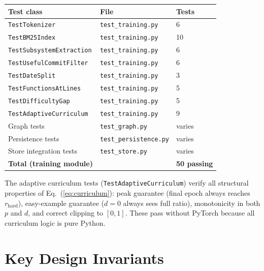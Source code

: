 \documentclass[11pt,a4paper]{article}
\begin{document}
\begin{center}
\begin{tabular}{@{}lll@{}}
\toprule
\textbf{Test class} & \textbf{File} & \textbf{Tests} \\
\midrule
\texttt{TestTokenizer}           & \texttt{test\_training.py} & 6  \\
\texttt{TestBM25Index}           & \texttt{test\_training.py} & 10 \\
\texttt{TestSubsystemExtraction} & \texttt{test\_training.py} & 6  \\
\texttt{TestUsefulCommitFilter}  & \texttt{test\_training.py} & 6  \\
\texttt{TestDateSplit}           & \texttt{test\_training.py} & 3  \\
\texttt{TestFunctionsAtLines}    & \texttt{test\_training.py} & 5  \\
\texttt{TestDifficultyGap}       & \texttt{test\_training.py} & 5  \\
\texttt{TestAdaptiveCurriculum}  & \texttt{test\_training.py} & 9  \\
\midrule
Graph tests                      & \texttt{test\_graph.py}    & varies \\
Persistence tests                & \texttt{test\_persistence.py} & varies \\
Store integration tests          & \texttt{test\_store.py}    & varies \\
\midrule
\textbf{Total (training module)} & & \textbf{50 passing} \\
\bottomrule
\end{tabular}
\end{center}

The adaptive curriculum tests (\texttt{TestAdaptiveCurriculum}) verify all
structural properties of Eq.~(\ref{eq:curriculum}): peak guarantee (final epoch
always reaches $r_{\text{hard}}$), easy-example guarantee ($d=0$ always sees
full ratio), monotonicity in both $p$ and $d$, and correct clipping to $[0,1]$.
These pass without PyTorch because all curriculum logic is pure Python.

\section{Key Design Invariants}
\label{sec:invariants}
\end{document}
